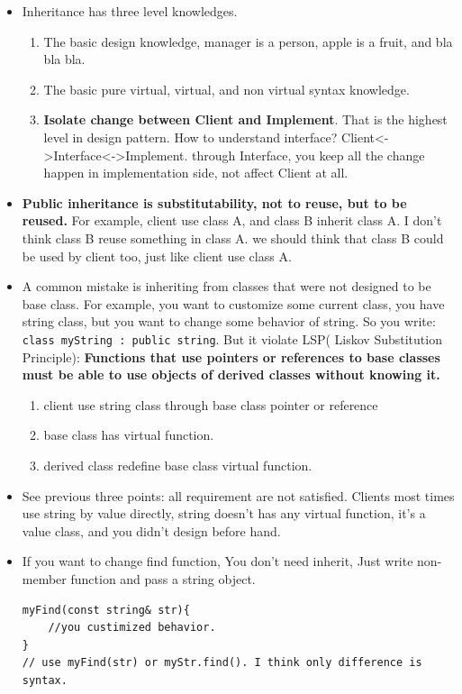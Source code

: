 \documentclass[a4paper,11pt,twoside]{book}
\begin{document}
\begin{itemize}
	\item Inheritance has three level knowledges.
	\begin{enumerate}
		\item The basic design knowledge, manager is a person, apple is a fruit, and bla bla bla.
		
		\item The basic  pure virtual, virtual, and non virtual syntax knowledge.
		
		\item \textbf{Isolate change between Client and Implement}. That is the highest level in design pattern. How to understand interface? Client<->Interface<->Implement. through Interface, you keep all the change happen in implementation side, not affect Client at all.
	\end{enumerate}
	
	\item \textbf{Public inheritance is substitutability, not to reuse, but to be reused. } For example, client use class A, and class B inherit class A.  I don't think class B reuse something in class A. we should think that class B could be used by client too, just like client use class A.
	
	\item  A common mistake is inheriting from classes that were not designed to be base class. For example, you want to customize some current class, you have string class, but you want to change some behavior of string. So you write: \texttt{class myString : public string}. But it violate LSP( Liskov Substitution Principle): \textbf{Functions that use pointers or references to base classes must be able to use objects of derived classes without knowing it. }
	\begin{enumerate}
		\item client use string class through base class pointer or reference
		\item base class has virtual function.
		\item derived class redefine base class virtual function.
	\end{enumerate}
	
	\item See previous three points: all requirement are not satisfied. Clients most times use string by value directly, string doesn't has any virtual function, it's a value class, and you didn't design before hand.
	
\item If you want to change find function, You don't need inherit,  Just write non-member function and pass a string object.
\begin{lstlisting}[numbers=none]
myFind(const string& str){
	//you custimized behavior.
}
// use myFind(str) or myStr.find(). I think only difference is syntax.
\end{lstlisting}
	

\end{itemize}
\end{document}

